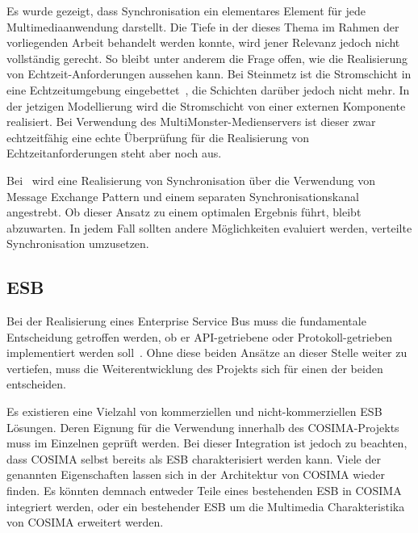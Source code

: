   Es wurde gezeigt, dass Synchronisation ein elementares Element für jede Multimediaanwendung darstellt. Die Tiefe in der dieses Thema im Rahmen der vorliegenden Arbeit behandelt werden konnte, wird jener Relevanz jedoch nicht vollständig gerecht. So bleibt unter anderem die Frage offen, wie die Realisierung von Echtzeit-Anforderungen aussehen kann. Bei Steinmetz ist die Stromschicht in eine Echtzeitumgebung eingebettet~\citep[S. 604]{multimedia_technologie}, die Schichten darüber jedoch nicht mehr. In der jetzigen Modellierung wird die Stromschicht von einer externen Komponente realisiert. Bei Verwendung des MultiMonster-Medienservers ist dieser zwar echtzeitfähig eine echte Überprüfung für die Realisierung von Echtzeitanforderungen steht aber noch aus.
  
  Bei~\citep{antons09} wird eine Realisierung von Synchronisation über die Verwendung von Message Exchange Pattern und einem separaten Synchronisationskanal angestrebt. Ob dieser Ansatz zu einem optimalen Ergebnis führt, bleibt abzuwarten. In jedem Fall sollten andere Möglichkeiten evaluiert werden, verteilte Synchronisation umzusetzen.


\subsection{ESB} %
\label{sub:esb_fragen}

  Bei der Realisierung eines Enterprise Service Bus muss die fundamentale Entscheidung getroffen werden, ob er API-getriebene oder Protokoll-getrieben implementiert werden soll~\citep[S. 59]{soa_in_practice}. Ohne diese beiden Ansätze an dieser Stelle weiter zu vertiefen, muss die Weiterentwicklung des Projekts sich für einen der beiden entscheiden.
  
  Es existieren eine Vielzahl von kommerziellen und nicht-kommerziellen ESB Lösungen. Deren Eignung für die Verwendung innerhalb des COSIMA-Projekts muss im Einzelnen geprüft werden. Bei dieser Integration ist jedoch zu beachten, dass COSIMA selbst bereits als ESB charakterisiert werden kann. Viele der genannten Eigenschaften lassen sich in der Architektur von COSIMA wieder finden. Es könnten demnach entweder Teile eines bestehenden ESB in COSIMA integriert werden, oder ein bestehender ESB um die Multimedia Charakteristika von COSIMA erweitert werden.




